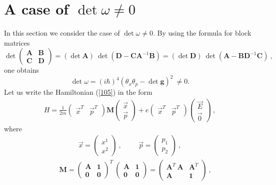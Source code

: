 \documentclass[a4paper,seceq]{ptptex}
\newcommand{\bfg}{ \boldsymbol{g} }
\newcommand{\bfA}{ \boldsymbol{A} }
\newcommand{\bfB}{ \boldsymbol{B} }
\newcommand{\bfC}{ \boldsymbol{C} }
\newcommand{\bfD}{ \boldsymbol{D} }
\newcommand{\bfM}{ \boldsymbol{M} }
\newcommand{\vecp}{ {\vec p} }
\newcommand{\vecx}{ {\vec x} }
\newcommand{\vecE}{ {\vec E} }
\begin{document}
\section{A case of $\det \omega \neq 0$}
In this section we consider the case of $\det \omega \neq 0$.
By using the formula for block matrices 
\begin{equation}
 \det \begin{pmatrix} \bfA & \bfB \\ \bfC & \bfD \end{pmatrix}
= \left( \det\bfA \right)~\det\left( \bfD - \bfC\bfA^{-1}\bfB \right)
= \left( \det\bfD \right)~\det\left( \bfA - \bfB\bfD^{-1}\bfC \right)~,
\label{201}
\end{equation}
one obtains
\begin{equation}
 \det \omega = (i \hbar)^4
          \left( \theta_x \theta_p - \det \bfg \right)^2~ \neq 0.
\label{202}
\end{equation}
Let us write the Hamiltonian (\ref{105}) in the form 
\begin{eqnarray}
 H = \frac{1}{2m} \begin{pmatrix} \vecx^T & \vecp^T \end{pmatrix} \bfM
                  \begin{pmatrix} \vecx \\ \vecp \end{pmatrix}
      + e \begin{pmatrix} \vecx^T & \vecp^T \end{pmatrix}
                \begin{pmatrix} \vecE \\ \vec{0} \end{pmatrix}~,
\label{203}
\end{eqnarray}
where 
\begin{eqnarray}
  \vecx = \begin{pmatrix} x^1 \\ x^2 \end{pmatrix}~, \hspace{1cm}
  \vecp = \begin{pmatrix} p_1 \\ p_2 \end{pmatrix}~,
\label{204}
\end{eqnarray}
\begin{eqnarray}
 & & \bfM = \begin{pmatrix} \bfA & \boldsymbol{1} \\
                    \boldsymbol{0} & \boldsymbol{0} \end{pmatrix}^T~
             \begin{pmatrix} \bfA & \boldsymbol{1} \\
                    \boldsymbol{0} & \boldsymbol{0} \end{pmatrix}
          = \begin{pmatrix} \bfA^T~\bfA & \bfA^T \\
                             \bfA & \boldsymbol{1} \end{pmatrix}~,
\label{205}
\end{eqnarray}
\end{document}

